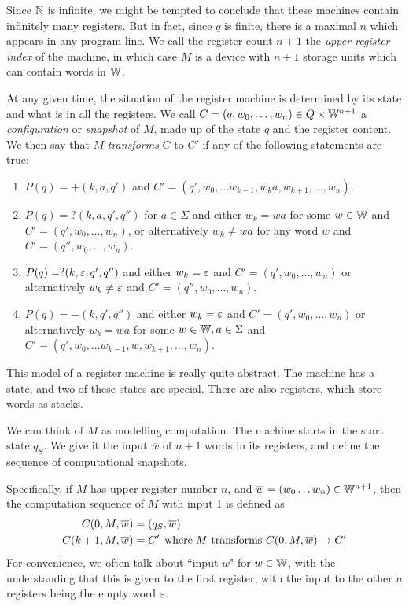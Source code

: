 \documentclass{article}
\begin{document}
Since $\mathbb{N}$ is infinite, we might be tempted to conclude that these machines contain infinitely many registers. But in fact, since $q$ is finite, there is a maximal $n$ which appears in any program line. We call the register count $n+1$ the \textit{upper register index} of the machine, in which case $M$ is a device with $n+1$ storage units which can contain words in $\mathbb{W}$.

At any given time, the situation of the register machine is determined by its state and what is in all the registers. We call $C = (q, w_0, \dots, w_n) \in Q \times \mathbb{W}^{n+1}$ a \textit{configuration} or \textit{snapshot} of $M$, made up of the state $q$ and the register content. We then say that $M$ \textit{transforms} $C$ to $C'$ if any of the following statements are true:
\begin{enumerate}
	\item $P(q) = +(k, a, q')$ and $C' = (q', w_0, \dots w_{k-1}, w_ka, w_{k+1}, \dots, w_n)$.
	\item $P(q) = ?(k, a, q', q'')$ for $a \in \Sigma$ and either $w_k = wa$ for some $w \in \mathbb{W}$ and $C' = (q', w_0, \dots, w_n)$, or alternatively $w_k \neq wa$ for any word $w$ and $C' = (q'', w_0, \dots, w_n)$.
	\item $P(q) = ?(k, \varepsilon, q', q'')$ and either $w_k = \varepsilon$ and $C' = (q', w_0, \dots, w_n)$ or alternatively $w_k \neq \varepsilon$ and $C' = (q'', w_0, \dots, w_n)$.
	\item $P(q) = -(k, q', q'')$ and either $w_k = \varepsilon$ and $C' = (q', w_0, \dots, w_n)$ or alternatively $w_k = wa$ for some $w \in \mathbb{W}, a \in \Sigma$ and $C' = (q', w_0, \dots w_{k-1}, w, w_{k+1}, \dots, w_n)$.
\end{enumerate}

This model of a register machine is really quite abstract. The machine has a state, and two of these states are special. There are also registers, which store words as stacks.

We can think of $M$ as modelling computation. The machine starts in the start state $q_S$. We give it the input $\overline w$ of $n+1$ words in its registers, and define the sequence of computational snapshots.

Specifically, if $M$ has upper register number $n$, and $\overline w = (w_0 \dots w_n) \in \mathbb{W}^{n+1}$, then the computation sequence of $M$ with input 1 is defined as
\begin{align*}
	C(0, M, \overline w)   & = (q_S, \overline w)                                          \\
	C(k+1, M, \overline w) & = C' \mathrel{\, \text{where}} M \text{ transforms } C(0, M, \overline w) \to C' 
\end{align*}
For convenience, we often talk about ``input $w$" for $w \in \mathbb{W}$, with the understanding that this is given to the first register, with the input to the other $n$ registers being the empty word $\varepsilon$.
\end{document}
